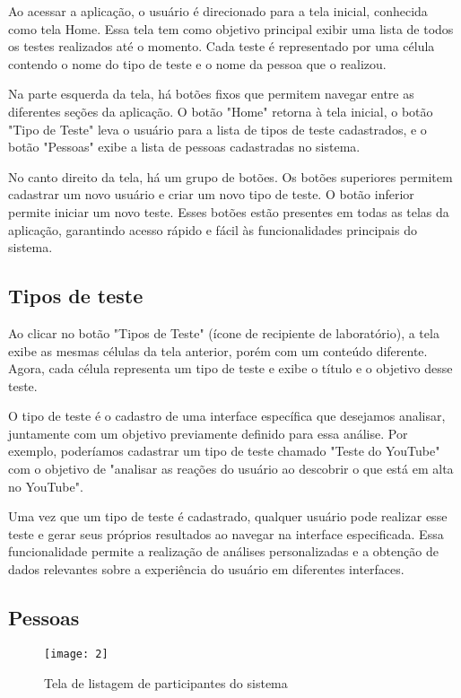Ao acessar a aplicação, o usuário é direcionado para a tela inicial, conhecida como tela Home. Essa tela tem como objetivo principal exibir uma lista de todos os testes realizados até o momento. Cada teste é representado por uma célula contendo o nome do tipo de teste e o nome da pessoa que o realizou.

Na parte esquerda da tela, há botões fixos que permitem navegar entre as diferentes seções da aplicação. O botão "Home" retorna à tela inicial, o botão "Tipo de Teste" leva o usuário para a lista de tipos de teste cadastrados, e o botão "Pessoas" exibe a lista de pessoas cadastradas no sistema.

No canto direito da tela, há um grupo de botões. Os botões superiores permitem cadastrar um novo usuário e criar um novo tipo de teste. O botão inferior permite iniciar um novo teste. Esses botões estão presentes em todas as telas da aplicação, garantindo acesso rápido e fácil às funcionalidades principais do sistema.

\subsection{Tipos de teste}

Ao clicar no botão "Tipos de Teste" (ícone de recipiente de laboratório), a tela exibe as mesmas células da tela anterior, porém com um conteúdo diferente. Agora, cada célula representa um tipo de teste e exibe o título e o objetivo desse teste.

O tipo de teste é o cadastro de uma interface específica que desejamos analisar, juntamente com um objetivo previamente definido para essa análise. Por exemplo, poderíamos cadastrar um tipo de teste chamado "Teste do YouTube" com o objetivo de "analisar as reações do usuário ao descobrir o que está em alta no YouTube".

Uma vez que um tipo de teste é cadastrado, qualquer usuário pode realizar esse teste e gerar seus próprios resultados ao navegar na interface especificada. Essa funcionalidade permite a realização de análises personalizadas e a obtenção de dados relevantes sobre a experiência do usuário em diferentes interfaces.

\subsection{Pessoas}

\begin{figure}[h]
  \caption{Tela de listagem de participantes do sistema}
  \centering
  \texttt{[image: 2]}
\end{figure}
\FloatBarrier

